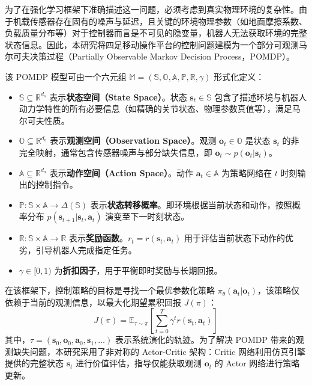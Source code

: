 为了在强化学习框架下准确描述这一问题，必须考虑到真实物理环境的复杂性。由于机载传感器存在固有的噪声与延迟，且关键的环境物理参数（如地面摩擦系数、负载质量分布等）对于控制器而言是不可见的隐变量，机器人无法获取环境的完整状态信息。因此，本研究将四足移动操作平台的控制问题建模为一个部分可观测马尔可夫决策过程（Partially Observable Markov Decision Process，POMDP）。

该 POMDP 模型可由一个六元组 $\mathbb{M} = (\mathbb{S}, \mathbb{O}, \mathbb{A}, \mathbb{P}, \mathbb{R}, \gamma)$ 形式化定义：

\begin{itemize}
    \item $\mathbb{S} \subseteq \mathbb{R}^{d_s}$ 表示\textbf{状态空间（State Space）}。状态 $\mathbf{s}_t \in \mathbb{S}$ 包含了描述环境与机器人动力学特性的所有必要信息（如精确的关节状态、物理参数真值等），满足马尔可夫性质。
    \item $\mathbb{O} \subseteq \mathbb{R}^{d_o}$ 表示\textbf{观测空间（Observation Space）}。观测 $\mathbf{o}_t \in \mathbb{O}$ 是状态 $\mathbf{s}_t$ 的非完全映射，通常包含传感器噪声与部分缺失信息，即 $\mathbf{o}_t \sim p(\mathbf{o}_t | \mathbf{s}_t)$。
    \item $\mathbb{A} \subseteq \mathbb{R}^{d_a}$ 表示\textbf{动作空间（Action Space）}。动作 $\mathbf{a}_t \in \mathbb{A}$ 为策略网络在 $t$ 时刻输出的控制指令。
    \item $\mathbb{P}: \mathbb{S} \times \mathbb{A} \rightarrow \Delta(\mathbb{S})$ 表示\textbf{状态转移概率}。即环境根据当前状态和动作，按照概率分布 $p(\mathbf{s}_{t+1} | \mathbf{s}_t, \mathbf{a}_t)$ 演变至下一时刻状态。
    \item $\mathbb{R}: \mathbb{S} \times \mathbb{A} \rightarrow \mathbb{R}$ 表示\textbf{奖励函数}。$r_t = r(\mathbf{s}_t, \mathbf{a}_t)$ 用于评估当前状态下动作的优劣，引导机器人完成指定任务。
    \item $\gamma \in [0, 1)$ 为\textbf{折扣因子}，用于平衡即时奖励与长期回报。
\end{itemize}

在该框架下，控制策略的目标是寻找一个最优参数化策略 $\pi_\theta(\mathbf{a}_t | \mathbf{o}_t)$，该策略仅依赖于当前的观测信息，以最大化期望累积回报 $J(\pi)$：
\begin{equation}
    J(\pi) = \mathbb{E}_{\tau \sim \pi} \left[ \sum_{t=0}^{T} \gamma^t r(\mathbf{s}_t, \mathbf{a}_t) \right]
\end{equation}
其中，$\tau = (\mathbf{s}_0, \mathbf{o}_0, \mathbf{a}_0, \mathbf{s}_1, \dots)$ 表示系统演化的轨迹。为了解决 POMDP 带来的观测缺失问题，本研究采用了非对称的 Actor-Critic 架构：Critic 网络利用仿真引擎提供的完整状态 $\mathbf{s}_t$ 进行价值评估，指导仅能获取观测 $\mathbf{o}_t$ 的 Actor 网络进行策略更新。

